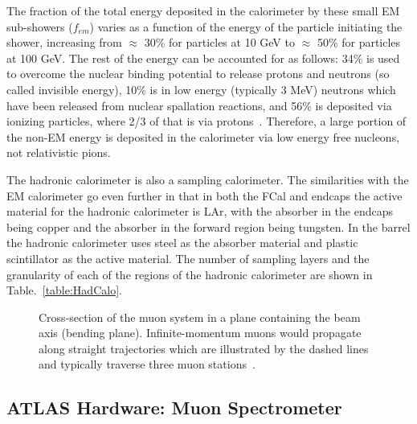 The fraction of the total energy deposited in the calorimeter by these small EM sub-showers ($f_{em}$) varies as a function of the energy of the particle initiating the shower, increasing from $\approx$ 30\% for particles at 10 GeV to $\approx$ 50\% for particles at 100 GeV.  
The rest of the energy can be accounted for as follows: 34\% is used to overcome the nuclear binding potential to release protons and neutrons (so called invisible energy), 10\% is in low energy (typically 3 MeV) neutrons which have been released from nuclear spallation reactions, and 56\% is deposited via ionizing particles, where 2/3 of that is via protons~\cite{Wigmans2008}.  
Therefore, a large portion of the non-EM energy is deposited in the calorimeter via low energy free nucleons, not relativistic pions.  

The hadronic calorimeter is also a sampling calorimeter.  
The similarities with the EM calorimeter go even further in that in both the FCal and endcaps the active material for the hadronic calorimeter is LAr, with the absorber in the endcaps being copper and the absorber in the forward region being tungsten.  
In the barrel the hadronic calorimeter uses steel as the absorber material and plastic scintillator as the active material.  
The number of sampling layers and the granularity of each of the regions of the hadronic calorimeter are shown in Table.~\ref{table:HadCalo}. 


\begin{figure}[!ht]
  \begin{center}
  \end{center}
  \caption[Grafic showing different particle interactions]
      {\small Cross-section of the muon system in a plane containing the beam axis (bending plane). Infinite-momentum muons would propagate along straight trajectories which are illustrated by the dashed lines and typically traverse three muon stations~\cite{JOIATLAS}.}
  \label{MuonSpectroFig}
\end{figure}


\subsection{ATLAS Hardware: Muon Spectrometer}

